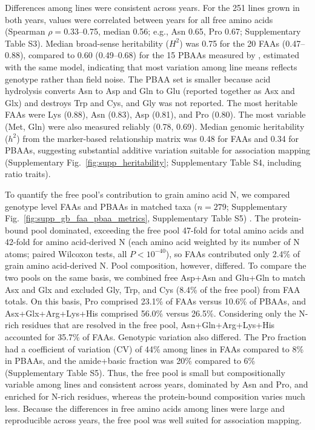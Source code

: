 Differences among lines were consistent across years. For the 251 lines grown in both years, values were correlated between years for all free amino acids (Spearman $\rho = 0.33$--0.75, median 0.56; e.g., Asn 0.65, Pro 0.67; Supplementary Table S3). Median broad-sense heritability ($H^2$) was 0.75 for the 20 FAAs (0.47--0.88), compared to 0.60 (0.49--0.68) for the 15 PBAAs measured by \citet{Shrestha2022}, estimated with the same model, indicating that most variation among line means reflects genotype rather than field noise. The PBAA set is smaller because acid hydrolysis converts Asn to Asp and Gln to Glu (reported together as Asx and Glx) and destroys Trp and Cys, and Gly was not reported. The most heritable FAAs were Lys (0.88), Asn (0.83), Asp (0.81), and Pro (0.80). The most variable (Met, Gln) were also measured reliably (0.78, 0.69). Median genomic heritability ($h^2$) from the marker-based relationship matrix was 0.48 for FAAs and 0.34 for PBAAs, suggesting substantial additive variation suitable for association mapping (Supplementary Fig.~\ref{fig:supp_heritability}; Supplementary Table S4, including ratio traits).

To quantify the free pool's contribution to grain amino acid N, we compared genotype level FAAs and PBAAs in matched taxa ($n = 279$; Supplementary Fig.~\ref{fig:supp_gb_faa_pbaa_metrics}, Supplementary Table S5) \citep{Shrestha2022}. The protein-bound pool dominated, exceeding the free pool 47-fold for total amino acids and 42-fold for amino acid-derived N (each amino acid weighted by its number of N atoms; paired Wilcoxon tests, all $P < 10^{-40}$), so FAAs contributed only 2.4\% of grain amino acid-derived N. Pool composition, however, differed. To compare the two pools on the same basis, we combined free Asp+Asn and Glu+Gln to match Asx and Glx and excluded Gly, Trp, and Cys (8.4\% of the free pool) from FAA totals. On this basis, Pro comprised 23.1\% of FAAs versus 10.6\% of PBAAs, and Asx+Glx+Arg+Lys+His comprised 56.0\% versus 26.5\%. Considering only the N-rich residues that are resolved in the free pool, Asn+Gln+Arg+Lys+His accounted for 35.7\% of FAAs. Genotypic variation also differed. The Pro fraction had a coefficient of variation (CV) of 44\% among lines in FAAs compared to 8\% in PBAAs, and the amide+basic fraction was 20\% compared to 6\% (Supplementary Table S5). Thus, the free pool is small but compositionally variable among lines and consistent across years, dominated by Asn and Pro, and enriched for N-rich residues, whereas the protein-bound composition varies much less. Because the differences in free amino acids among lines were large and reproducible across years, the free pool was well suited for association mapping.

